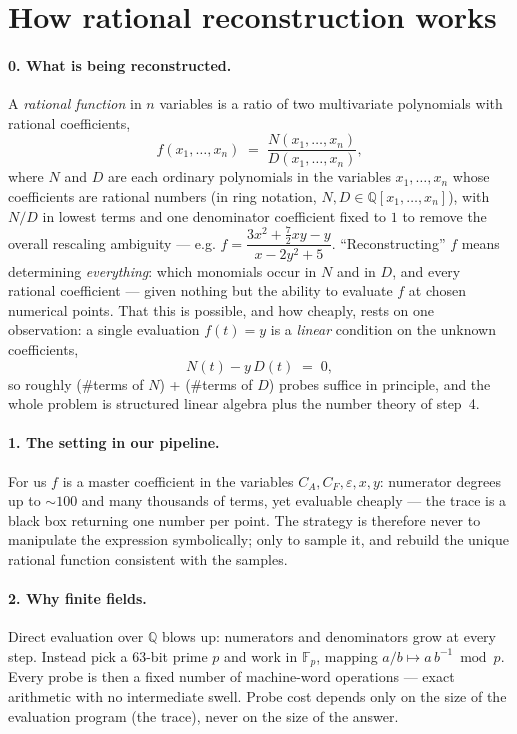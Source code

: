 \documentclass[11pt]{article}
\newcommand{\eps}{\varepsilon}
\newcommand{\Fp}{\mathbb{F}_p}
\newcommand{\Q}{\mathbb{Q}}
\begin{document}
\section*{How rational reconstruction works}

\paragraph{0. What is being reconstructed.}
A \emph{rational function} in $n$ variables is a ratio of two
multivariate polynomials with rational coefficients,
\[
  f(x_1,\dots,x_n) \;=\; \frac{N(x_1,\dots,x_n)}{D(x_1,\dots,x_n)},
\]
where $N$ and $D$ are each ordinary polynomials in the variables
$x_1,\dots,x_n$ whose coefficients are rational numbers (in ring
notation, $N, D \in \Q[x_1,\dots,x_n]$), with $N/D$ in lowest
terms and one denominator coefficient fixed to
$1$ to remove the overall rescaling ambiguity --- e.g.
$f = \dfrac{3x^2 + \tfrac72 xy - y}{x - 2y^2 + 5}$.
``Reconstructing'' $f$ means determining \emph{everything}: which
monomials occur in $N$ and in $D$, and every rational coefficient ---
given nothing but the ability to evaluate $f$ at chosen numerical
points.  That this is possible, and how cheaply, rests on one
observation: a single evaluation $f(t) = y$ is a \emph{linear}
condition on the unknown coefficients,
\[
  N(t) - y\, D(t) \;=\; 0 ,
\]
so roughly (\#terms of $N$) + (\#terms of $D$) probes suffice in
principle, and the whole problem is structured linear algebra plus
the number theory of step~4.

\paragraph{1. The setting in our pipeline.}
For us $f$ is a master coefficient in the variables
$C_A, C_F, \eps, x, y$: numerator degrees up to $\sim 100$ and many
thousands of terms, yet evaluable cheaply --- the trace is a black
box returning one number per point.  The strategy is therefore never
to manipulate the expression symbolically; only to sample it, and
rebuild the unique rational function consistent with the samples.

\paragraph{2. Why finite fields.}
Direct evaluation over $\Q$ blows up: numerators and denominators
grow at every step.  Instead pick a 63-bit prime $p$ and work in
$\Fp$, mapping $a/b \mapsto a\, b^{-1} \bmod p$.  Every probe is then
a fixed number of machine-word operations --- exact arithmetic with
no intermediate swell.  Probe cost depends only on the size of the
evaluation program (the trace), never on the size of the answer.
\end{document}
